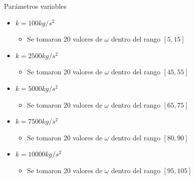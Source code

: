 \begin{frame}
    \begin{block}{Parámetros variables}
        \begin{itemize}
            \item $k=100 kg/s^2 $
                \begin{itemize}
                    \item Se tomaron 20 valores de $\omega$ dentro del rango $[5, 15]$
                \end{itemize}
            \item $k=2500 kg/s^2$
                \begin{itemize}
                    \item Se tomaron 20 valores de $\omega$ dentro del rango $[45, 55]$
                \end{itemize}
            \item $k=5000 kg/s^2$
                \begin{itemize}
                    \item Se tomaron 20 valores de $\omega$ dentro del rango $[65, 75]$
                \end{itemize}
            \item $k=7500 kg/s^2$
                \begin{itemize}
                    \item Se tomaron 20 valores de $\omega$ dentro del rango $[80, 90]$
                \end{itemize}
            \item $k=10000 kg/s^2$
                \begin{itemize}
                    \item Se tomaron 20 valores de $\omega$ dentro del rango $[95, 105]$
                \end{itemize}
        \end{itemize}
    \end{block}
\end{frame}

